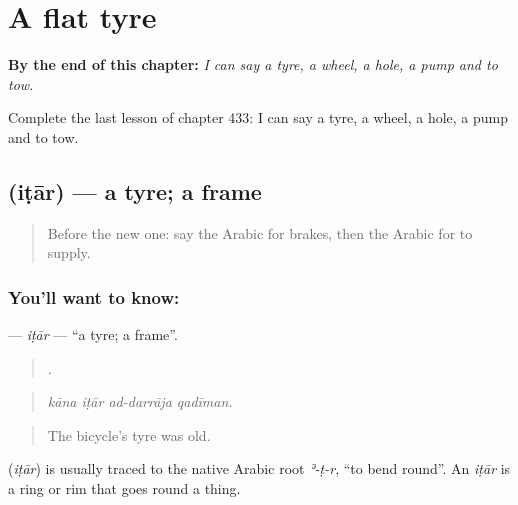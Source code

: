 
\chapter{A flat tyre}
\label{ch:ar-a-flat-tyre}

\begin{chapteropening}
\textbf{By the end of this chapter:} \emph{I can say a tyre, a wheel, a hole, a pump and to tow.}

Complete the last lesson of chapter 433: I can say a tyre, a wheel, a hole, a pump and to tow.
\end{chapteropening}

\section[\texorpdfstring{\ar{إطار} (iṭār)}{إطار (iṭār)}]{ (iṭār) — a tyre; a frame}

\label{lesson:AR-C433-itar}



\begin{quote}
Before the new one: say the Arabic for brakes, then the Arabic for to supply.
\end{quote}

\subsection*{You'll want to know: }
\textbf{} — \emph{iṭār} — \textquotedblleft{}a tyre; a frame\textquotedblright{}.

\begin{quote}
   .
\end{quote}

\begin{quote}
\emph{kāna iṭār ad-darrāja qadīman.}
\end{quote}

\begin{quote}
The bicycle's tyre was old.
\end{quote}

\begin{cousinweb}
\textbf{} (\emph{iṭār}) is usually traced to the native Arabic root \emph{ʾ-ṭ-r}, \textquotedblleft{}to bend round\textquotedblright{}. An \emph{iṭār} is a ring or rim that goes round a thing.
\end{cousinweb}


